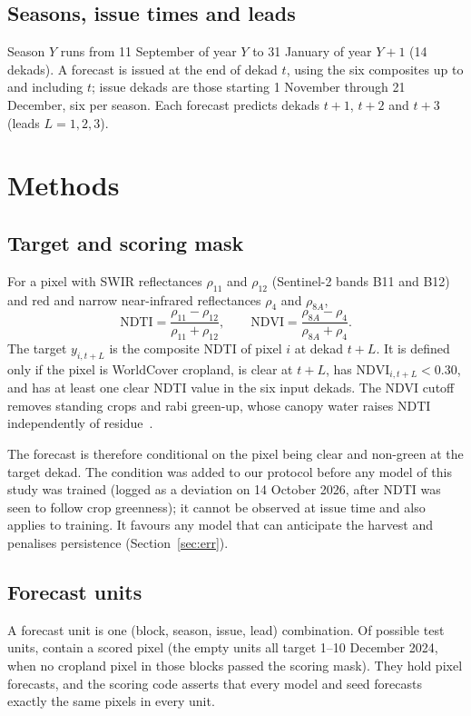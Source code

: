 \documentclass[journal]{IEEEtran}
\begin{document}
\subsection{Seasons, issue times and leads}
Season $Y$ runs from 11 September of year $Y$ to 31 January of year $Y{+}1$ (14 dekads). A forecast is issued at the end of dekad $t$, using the six composites up to and including $t$; issue dekads are those starting 1 November through 21 December, six per season. Each forecast predicts dekads $t{+}1$, $t{+}2$ and $t{+}3$ (leads $L=1,2,3$).

\section{Methods}
\subsection{Target and scoring mask}
For a pixel with SWIR reflectances $\rho_{11}$ and $\rho_{12}$ (Sentinel-2 bands B11 and B12) and red and narrow near-infrared reflectances $\rho_{4}$ and $\rho_{8A}$,
\begin{equation}
\mathrm{NDTI}=\frac{\rho_{11}-\rho_{12}}{\rho_{11}+\rho_{12}},\qquad
\mathrm{NDVI}=\frac{\rho_{8A}-\rho_{4}}{\rho_{8A}+\rho_{4}}.
\end{equation}
The target $y_{i,t+L}$ is the composite NDTI of pixel $i$ at dekad $t{+}L$. It is defined only if the pixel is WorldCover cropland, is clear at $t{+}L$, has $\mathrm{NDVI}_{i,t+L}<0.30$, and has at least one clear NDTI value in the six input dekads. The NDVI cutoff removes standing crops and rabi green-up, whose canopy water raises NDTI independently of residue~\cite{zheng}.

The forecast is therefore conditional on the pixel being clear and non-green at the target dekad. The condition was added to our protocol before any model of this study was trained (logged as a deviation on 14 October 2026, after NDTI was seen to follow crop greenness); it cannot be observed at issue time and also applies to training. It favours any model that can anticipate the harvest and penalises persistence (Section~\ref{sec:err}).

\subsection{Forecast units}
A forecast unit is one (block, season, issue, lead) combination. Of \finyNUnitsPossible{} possible test units, \finNUnitsCore{} contain a scored pixel (the \finxNUnitsEmpty{} empty units all target 1--10 December 2024, when no cropland pixel in those blocks passed the scoring mask). They hold \finNPixelForecasts{} pixel forecasts, and the scoring code asserts that every model and seed forecasts exactly the same pixels in every unit.
\end{document}
